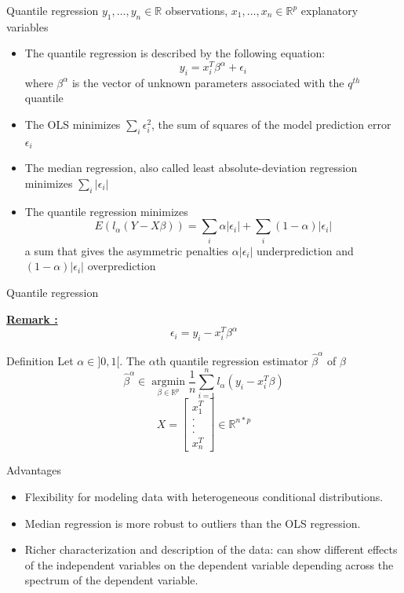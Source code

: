 \documentclass[unknownkeysallowed]{beamer}
\begin{document}
\begin{frame}{Quantile regression}
$y_{1},\dots, y_{n}\in \mathbb{R}$ observations, $x_{1},\dots, x_{n}\in \mathbb{R}^p$ explanatory variables \\
\begin{itemize}
    \item The quantile regression is described by the following equation:
    $$y_i = x_i^T \beta^{\alpha} + \epsilon_i$$
    where $\beta^{\alpha}$ is the vector of unknown parameters associated with the $q^{th}$ quantile
    \item The OLS minimizes $\sum_i \epsilon_i^2$, the sum of squares of the model prediction error $\epsilon_i$
    \item The median regression, also called least absolute-deviation regression minimizes $\sum_i \left | \epsilon_i \right |$
    \item The quantile regression minimizes 
    $$ E(l _{\alpha }(Y-X\beta )) = \sum_i \alpha \left | \epsilon_i \right | + \sum_i (1 - \alpha) \left | \epsilon_i \right |$$
    a sum that gives the asymmetric penalties $  \alpha \left | \epsilon_i \right |$ underprediction and $(1 - \alpha) \left | \epsilon_i \right |$ overprediction
   
\end{itemize}   
\end{frame}


\begin{frame}{Quantile regression}


\underline{\textbf{Remark :}}
$$ \epsilon_i = y_i - x_i^T \beta^{\alpha}$$

\begin{alertblock}{Definition}
Let $\alpha \in ]0,1[$. The $\alpha$th quantile regression estimator $\hat{\beta}^{\alpha}$ of $\beta$
$$\hat{\beta}^{\alpha}\in \operatorname*{argmin}_{\beta\in \mathds{R}^p}\dfrac{1}{n}\sum_{i=1}^{n}l_{\alpha}(y_{i}-x_{i}^T \beta)$$
$$X= \begin{bmatrix} x_{1}^T \\ .\\.\\.\\
x_{n}^T
\end{bmatrix} \in \mathds{R}^{n*p}$$

\end{alertblock}
\end{frame}

\begin{frame}{Advantages}

\begin{itemize}
    \item Flexibility for modeling data with heterogeneous conditional distributions.
    \item Median regression is more robust to outliers than the OLS regression.
    \item Richer characterization and description of the data: can show different effects of the independent variables on the dependent variable depending across the spectrum of the dependent variable.
\end{itemize}   

\end{frame}
\end{document}
